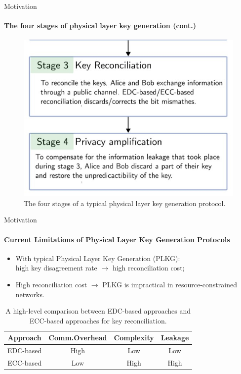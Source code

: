 \begin{frame}{Motivation}
\framesubtitle{The four stages of physical layer key generation (cont.)}
\vspace{-.5cm}
\begin{figure}
    \centering
    \includegraphics[scale = 0.7]{slides/figures/KGR2.jpg}
    \caption{The four stages of a typical physical layer key generation protocol.}
    \label{fig:PLKG2}
\end{figure}
\end{frame}


\begin{frame}{Motivation}
\framesubtitle{Current Limitations of Physical Layer Key Generation Protocols}
\begin{itemize}
    \item With typical Physical Layer Key Generation (PLKG):\\ high key disagreement rate $\rightarrow$ high reconciliation cost;
    \item High reconciliation cost $\rightarrow$ PLKG is impractical in resource-constrained networks.    
\end{itemize}
\begin{table}
    \centering
    \begin{tabular}{|c|ccc|}
    \hline
        \textbf{Approach} & \textbf{Comm.Overhead} & \textbf{Complexity} & \textbf{Leakage} \\
        \hline
        EDC-based & High & Low & Low\\
        ECC-based & Low & High & High\\
        \hline
    \end{tabular}
    \caption{A high-level comparison between EDC-based approaches and ECC-based approaches for key reconciliation.}
\end{table}
\end{frame}

